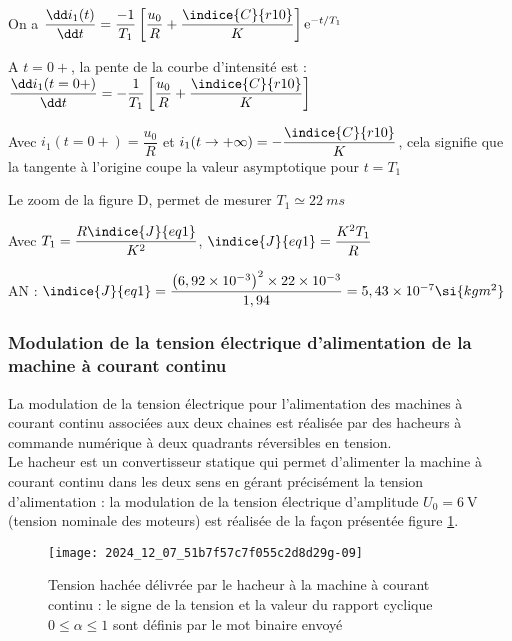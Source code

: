 \ifprof
\begin{corrige}
On a $\dfrac{\dd i_1 (t)}{\dd t}=\dfrac{-1}{T_1} \left[\dfrac{u_0}{R}+\dfrac{\indice{C}{r10}}{K}\right]\text{e}^{-t /T_1}$

A $t = 0+$, la pente de la courbe d’intensité est : $\dfrac{\dd i_1 (t=0+)}{\dd t}=-\dfrac{1}{T_1}  \left[ \dfrac{u_0}{R}+\dfrac{\indice{C}{r10}}{K}\right]$

Avec $i_1(t=0+)=\dfrac{u_0}{R}$ et $i_1(t\to +\infty)= - \dfrac{\indice{C}{r10}}{K}$, cela signifie que la tangente à l’origine coupe la valeur asymptotique pour $t=T_1$

Le zoom de la figure D, permet de mesurer $T_1 \simeq \SI{22}{ms}$

Avec $T_1=\dfrac{R\indice{J}{eq1}}{K^2}$, $\indice{J}{eq1} =\dfrac{K^2  T_1}{R}$


AN :  $\indice{J}{eq1} =\dfrac{\left(6,92\times 10^{-3} \right)^2 \times  22 \times 10^{-3}}{1,94} =5,43 \times 10 ^{-7} \si{kgm^2}$

\end{corrige}
\else
\fi


\subsubsection{ Modulation de la tension électrique d'alimentation de la machine à courant continu}
\ifprof
\else
La modulation de la tension électrique pour l'alimentation des machines à courant continu associées aux deux chaines est réalisée par des hacheurs à commande numérique à deux quadrants réversibles en tension.\\
Le hacheur est un convertisseur statique qui permet d'alimenter la machine à courant continu dans les deux sens en gérant précisément la tension d'alimentation : la modulation de la tension électrique d'amplitude $U_{0}=6 \mathrm{~V}$ (tension nominale des moteurs) est réalisée de la façon présentée figure \ref{CCS_MP_2017:fig_13}.\\

\begin{figure}[!h]
\centering
\texttt{[image: 2024\_12\_07\_51b7f57c7f055c2d8d29g-09]}

\caption{Tension hachée délivrée par le hacheur à la machine à courant continu : le signe de la tension et la valeur du rapport cyclique $0 \leqslant \alpha \leqslant 1$ sont définis par le mot binaire envoyé \label{CCS_MP_2017:fig_13}}
\end{figure}

